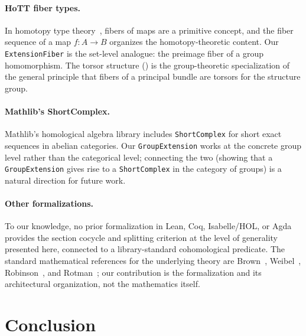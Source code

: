 \documentclass[11pt]{article}
\newcommand{\lean}[1]{\texttt{#1}}
\begin{document}
\paragraph{HoTT fiber types.}
In homotopy type theory~\cite{HoTTBook}, fibers of maps are a primitive concept,
and the fiber sequence of a map $f : A \to B$ organizes the homotopy-theoretic
content.  Our \lean{ExtensionFiber} is the set-level analogue: the preimage fiber
of a group homomorphism.  The torsor structure () is the
group-theoretic specialization of the general principle that fibers of a principal
bundle are torsors for the structure group.

\paragraph{Mathlib's ShortComplex.}
Mathlib's homological algebra library includes \lean{ShortComplex} for short exact
sequences in abelian categories.  Our \lean{GroupExtension} works at the concrete
group level rather than the categorical level; connecting the two (showing that a
\lean{GroupExtension} gives rise to a \lean{ShortComplex} in the category of groups)
is a natural direction for future work.

\paragraph{Other formalizations.}
To our knowledge, no prior formalization in Lean, Coq, Isabelle/HOL, or Agda
provides the section cocycle and splitting criterion at the level of generality
presented here, connected to a library-standard cohomological predicate.
The standard mathematical references for the underlying theory are
Brown~\cite{Brown1982}, Weibel~\cite{Weibel1994},
Robinson~\cite{Robinson1996}, and Rotman~\cite{Rotman2009}; our contribution
is the formalization and its architectural organization, not the mathematics
itself.

\section{Conclusion}\label{sec:conclusion}
\end{document}
